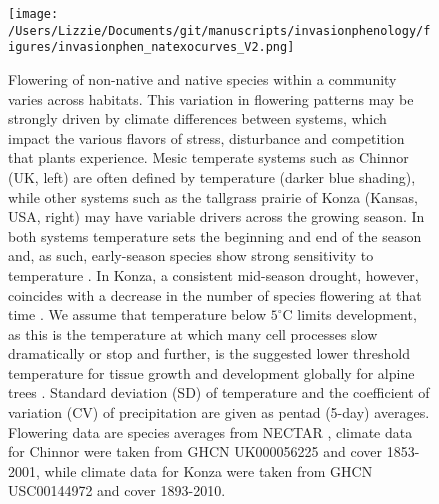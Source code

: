 \documentclass[11pt,a4paper,oneside]{article}
\begin{document}
\newpage
\begin{figure}[h!]
\centering \texttt{[image: /Users/Lizzie/Documents/git/manuscripts/invasionphenology/figures/invasionphen\_natexocurves\_V2.png]}
\caption{Flowering of non-native and native species within a community varies across habitats. This variation in flowering patterns may be strongly driven by climate differences between systems, which impact the various flavors of stress, disturbance and competition that plants experience. Mesic temperate systems such as Chinnor (UK, left) are often defined by temperature (darker blue shading), while other systems such as the tallgrass prairie of Konza (Kansas, USA, right) may have variable drivers across the growing season. In both systems temperature sets the beginning and end of the season and, as such, early-season species show strong sensitivity to temperature \citep{Cook:2012,Craine:2012kl}. In Konza, a consistent mid-season drought, however, coincides with a decrease in the number of species flowering at that time \citep{Craine:2012kl}. We assume that temperature below \(5^{\circ}\mathrm{C}\) limits development, as this is the temperature at which many cell processes slow dramatically or stop \citep{larcher2003} and further, is the suggested lower threshold temperature for tissue growth and development globally for
alpine trees \citep{Korner:1998qf}. Standard deviation (SD)
of temperature and the coefficient of variation (CV) of precipitation are given as pentad (5-day)
averages. Flowering data are species averages from NECTAR \citep{nectar}, climate data for Chinnor were taken from GHCN UK000056225 and cover 1853-2001, while climate data for Konza were taken from GHCN USC00144972 and cover 1893-2010.} %
\end{figure}
\end{document}
